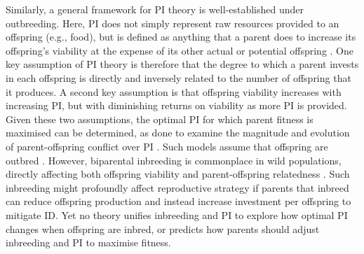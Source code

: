 \documentclass[12pt]{article}
\begin{document}
Similarly, a general framework for PI theory is well-established under outbreeding. Here, PI does not simply represent raw resources provided to an offspring (e.g., food), but is defined as anything that a parent does to increase its offspring's viability at the expense of its other actual or potential offspring \cite[][]{Trivers1972, Trivers1974}. One key assumption of PI theory is therefore that the degree to which a parent invests in each offspring is directly and inversely related to the number of offspring that it produces. A second key assumption is that offspring viability increases with increasing PI, but with diminishing returns on viability as more PI is provided. Given these two assumptions, the optimal PI for which parent fitness is maximised can be determined, as done to examine the magnitude and evolution of parent-offspring conflict over PI \cite[e.g.,][]{Macnair1978, Parker1978, Parker1985, DeJong2005, Kuijper2012}. Such models assume that offspring are outbred \cite[or result from self-fertilisation,][]{DeJong2005}. However, biparental inbreeding is commonplace in wild populations, directly affecting both offspring viability and parent-offspring relatedness \cite[][]{Trivers1974, Lynch1998, OGrady2006, Charlesworth2009, Reid2016}. Such inbreeding might profoundly affect reproductive strategy if parents that inbreed can reduce offspring production and instead increase investment per offspring to mitigate ID. Yet no theory unifies inbreeding and PI to explore how optimal PI changes when offspring are inbred, or predicts how parents should adjust inbreeding and PI to maximise fitness. 
\end{document}
